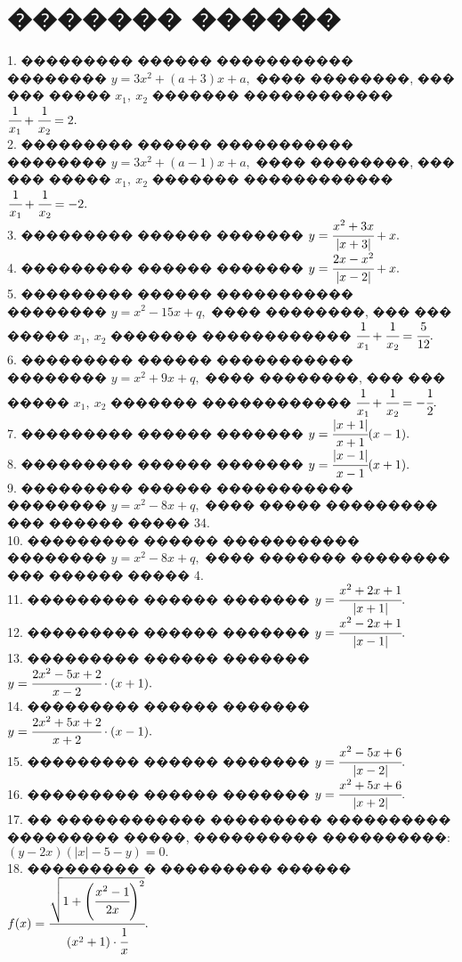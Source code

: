 \documentclass[12pt]{article}
\begin{document}
\section{������� ������}
1. ��������� ������ ����������� �������� $y=3x^2+(a+3)x+a,$ ���� ��������,
��� ��� ����� $x_1,\ x_2$ ������� ������������ $\cfrac{1}{x_1}+\cfrac{1}{x_2}=2.$\\
2. ��������� ������ ����������� �������� $y=3x^2+(a-1)x+a,$ ���� ��������,
��� ��� ����� $x_1,\ x_2$ ������� ������������ $\cfrac{1}{x_1}+\cfrac{1}{x_2}=-2.$\\
3. ��������� ������ ������� $y=\cfrac{x^2+3x}{|x+3|}+x.$\\
4. ��������� ������ ������� $y=\cfrac{2x-x^2}{|x-2|}+x.$\\
5. ��������� ������ ����������� �������� $y=x^2-15x+q,$ ���� ��������,
��� ��� ����� $x_1,\ x_2$ ������� ������������ $\cfrac{1}{x_1}+\cfrac{1}{x_2}=\cfrac{5}{12}.$\\
6. ��������� ������ ����������� �������� $y=x^2+9x+q,$ ���� ��������,
��� ��� ����� $x_1,\ x_2$ ������� ������������ $\cfrac{1}{x_1}+\cfrac{1}{x_2}=-\cfrac{1}{2}.$\\
7. ��������� ������ ������� $y=\cfrac{|x+1|}{x+1}(x-1).$\\
8. ��������� ������ ������� $y=\cfrac{|x-1|}{x-1}(x+1).$\\
9. ��������� ������ ����������� �������� $y=x^2-8x+q,$ ���� ����� ��������� ��� ������ ����� 34.\\
10. ��������� ������ ����������� �������� $y=x^2-8x+q,$ ���� ������� �������� ��� ������ ����� 4.\\
11. ��������� ������ ������� $y=\cfrac{x^2+2x+1}{|x+1|}.$\\
12. ��������� ������ ������� $y=\cfrac{x^2-2x+1}{|x-1|}.$\\
13. ��������� ������ ������� $y=\cfrac{2x^2-5x+2}{x-2}\cdot(x+1).$\\
14. ��������� ������ ������� $y=\cfrac{2x^2+5x+2}{x+2}\cdot(x-1).$\\
15. ��������� ������ ������� $y=\cfrac{x^2-5x+6}{|x-2|}.$\\
16. ��������� ������ ������� $y=\cfrac{x^2+5x+6}{|x+2|}.$\\
17. �� ������������ ��������� ���������� ��������� �����, ���������� ����������:\\ $(y-2x)\left(|x|-5-y\right)=0.$\\
18. ��������� � ��������� ������ $f(x)=\cfrac{\sqrt{1+\left(\cfrac{x^2-1}{2x}\right)^2}}{(x^2+1)\cdot\cfrac{1}{x}}.$\\
\end{document}
